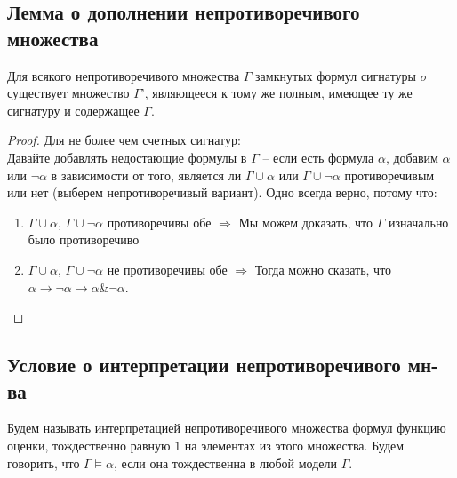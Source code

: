 \subsection{Лемма о дополнении непротиворечивого множества}
\label{sec-8-2}
\begin{lemma}
Для всякого непротиворечивого множества $\Gamma$ замкнутых формул сигнатуры $\sigma$ существует множество $\Gamma’$, являющееся к тому же полным, имеющее ту же сигнатуру и содержащее $\Gamma$.
\end{lemma}
\begin{proof}
Для не более чем счетных сигнатур:\\
Давайте добавлять недостающие формулы в $\Gamma$ -- если есть формула $\alpha$, добавим $\alpha$ или $\neg \alpha$ в зависимости от того, является ли $\Gamma \cup \alpha$ или $\Gamma \cup \neg \alpha$ противоречивым или нет (выберем непротиворечивый вариант). Одно всегда верно, потому что:
\begin{enumerate}
\item $\Gamma \cup \alpha$, $\Gamma \cup \neg \alpha$ противоречивы обе $\Rightarrow$ Мы можем доказать, что $\Gamma$ изначально было противоречиво
\item $\Gamma \cup \alpha$, $\Gamma \cup \neg \alpha$ не противоречивы обе $\Rightarrow$ Тогда можно сказать, что $\alpha \to \neg \alpha \to \alpha \& \neg \alpha$.
\end{enumerate}
\end{proof}
\subsection{Условие о интерпретации непротиворечивого мн-ва}
\label{sec-8-3}
Будем называть интерпретацией непротиворечивого множества формул функцию оценки, тождественно равную $1$ на элементах из этого множества. Будем говорить, что $\Gamma \vDash \alpha$, если она тождественна в любой модели $\Gamma$.

